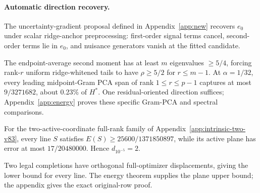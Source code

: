\paragraph{Automatic direction recovery.} The uncertainty-gradient proposal defined in Appendix~\ref{app:new} recovers $e_0$ under scalar ridge-anchor preprocessing: first-order signal terms cancel, second-order terms lie in $e_0$, and nuisance generators vanish at the fitted candidate.

The endpoint-average second moment has at least $m$ eigenvalues $\ge5/4$, forcing rank-$r$ uniform ridge-whitened tails to have $\rho\ge5/2$ for $r\le m-1$. At $\alpha=1/32$, every leading midpoint-Gram PCA span of rank $1\le r\le p-1$ captures at most $9/3271682$, about 0.23\% of $H^*$. One residual-oriented direction suffices; Appendix~\ref{app:energy} proves these specific Gram-PCA and spectral comparisons.

\noindent\begin{minipage}{\columnwidth}
\begin{proposition}\label{prop:intrinsic-two-v83}
For the two-active-coordinate full-rank family of Appendix~\ref{app:intrinsic-two-v83}, every line $S$ satisfies $E(S)\ge25600/1371850897$, while its active plane has error at most $17/20480000$. Hence $d_{10^{-5}}=2$.
\end{proposition}
Two legal completions have orthogonal full-optimizer displacements, giving the lower bound for every line. The energy theorem supplies the plane upper bound; the appendix gives the exact original-row proof.
\end{minipage}


